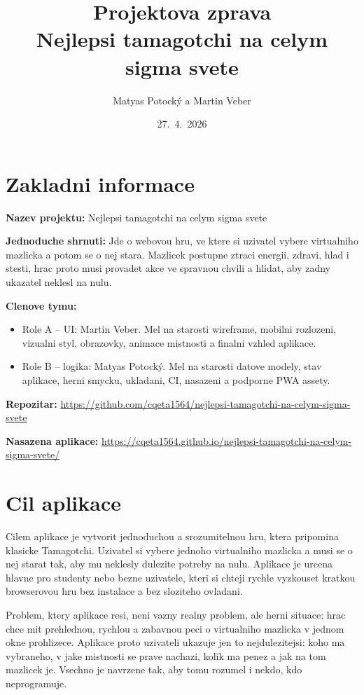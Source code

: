 \documentclass[12pt,a4paper]{article}
\title{Projektova zprava\\Nejlepsi tamagotchi na celym sigma svete}
\author{Matyas Potock\'y a Martin Veber}
\date{27.~4.~2026}
\begin{document}
\maketitle
\tableofcontents
\newpage

\section{Zakladni informace}

\textbf{Nazev projektu:} Nejlepsi tamagotchi na celym sigma svete

\textbf{Jednoduche shrnuti:} Jde o webovou hru, ve ktere si uzivatel vybere virtualniho mazlicka a potom se o nej stara. Mazlicek postupne ztraci energii, zdravi, hlad i stesti, hrac proto musi provadet akce ve spravnou chvili a hlidat, aby zadny ukazatel neklesl na nulu.

\textbf{Clenove tymu:}
\begin{itemize}[leftmargin=2em]
  \item Role A -- UI: Martin Veber. Mel na starosti wireframe, mobilni rozlozeni, vizualni styl, obrazovky, animace mistnosti a finalni vzhled aplikace.
  \item Role B -- logika: Matyas Potock\'y. Mel na starosti datove modely, stav aplikace, herni smycku, ukladani, CI, nasazeni a podporne PWA assety.
\end{itemize}

\textbf{Repozitar:} \url{https://github.com/cqeta1564/nejlepsi-tamagotchi-na-celym-sigma-svete}

\textbf{Nasazena aplikace:} \url{https://cqeta1564.github.io/nejlepsi-tamagotchi-na-celym-sigma-svete/}

\section{Cil aplikace}

Cilem aplikace je vytvorit jednoduchou a srozumitelnou hru, ktera pripomina klasicke Tamagotchi. Uzivatel si vybere jednoho virtualniho mazlicka a musi se o nej starat tak, aby mu neklesly dulezite potreby na nulu. Aplikace je urcena hlavne pro studenty nebo bezne uzivatele, kteri si chteji rychle vyzkouset kratkou browserovou hru bez instalace a bez sloziteho ovladani.

Problem, ktery aplikace resi, neni vazny realny problem, ale herni situace: hrac chce mit prehlednou, rychlou a zabavnou peci o virtualniho mazlicka v jednom okne prohlizece. Aplikace proto uzivateli ukazuje jen to nejdulezitejsi: koho ma vybraneho, v jake mistnosti se prave nachazi, kolik ma penez a jak na tom mazlicek je. Vsechno je navrzene tak, aby tomu rozumel i nekdo, kdo neprogramuje.
\end{document}
